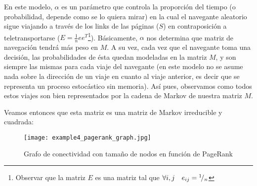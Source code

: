 \par En este modelo, $\alpha$ es un par\'ametro que controla la proporci\'on del
tiempo (o probabilidad, depende como se lo quiera mirar) en la cual el navegante
aleatorio sigue viajando a trav\'es de los links de las p\'aginas ($S$)
en contraposici\'on a teletransportarse ($E = \frac{1}{n}ee^T$\footnote{Observar
que la matriz $E$ es una matriz tal que $\forall i,j \quad e_{ij} =
{}^{1}\!/_{n}$}). B\'asicamente, $\alpha$ nos determina que matriz de
navegaci\'on tendr\'a m\'as peso en $M$. A su vez, cada vez que el navegante
toma una decisi\'on, las probabilidades de \'esta quedan modeladas en la
matriz $M$, y son siempre las mismas para cada viaje del navegante (en este modelo
no se asume nada sobre la direcci\'on de un viaje en cuanto al viaje anterior,
es decir que se representa un proceso estoc\'astico sin memoria). As\'i pues,
observamos como todos estos viajes son bien representados por la cadena de
Markov de nuestra matriz $M$.

\par Veamos entonces que esta matriz es una matriz de Markov irreducible y
cuadrada:

\begin{wrapfigure}[20]{r}{0.5\textwidth}
    \centering
    \texttt{[image: example4\_pagerank\_graph.jpg]}
    \caption{Grafo de conectividad con tama\~no de nodos en funci\'on de
        PageRank}
\end{wrapfigure}
\noindent

